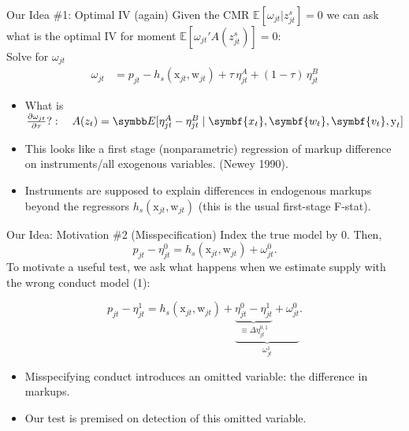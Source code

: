 \documentclass[aspectratio=169,10pt]{beamer}
\begin{document}
\begin{frame}{Our Idea \#1: Optimal IV (again)}
Given the CMR $\mathbb{E}[\omega_{jt}  | z_{jt}^s]=0$ we can ask what is the optimal IV for moment $\mathbb{E}[\omega_{jt}' A(z_{jt}^s)]=0$:\\
\vspace{0.25cm}
Solve for $\omega_{jt}$
\begin{align*}
\omega_{jt} &= p_{jt} - h_s(\textrm{x}_{jt},\textrm{w}_{jt}) + \tau\, \eta_{jt}^A + (1-\tau)\,\eta_{jt}^B
\end{align*}
\begin{itemize}
  \item What is $\frac{\partial \omega_{jt}}{\partial \tau}?: \quad A(z_t) = \E[\eta_{jt}^A - \eta_{jt}^B \mid \symbf{x_t}, \symbf{w_t}, \symbf{v_t}, \textrm{y}_t]$
  \item This looks like a \alert{first stage} (nonparametric) regression of markup difference on instruments/all exogenous variables. (Newey 1990).
  \item Instruments are supposed to explain \alert{differences in endogenous markups} beyond the regressors $h_s(\textrm{x}_{jt},\textrm{w}_{jt})$ (this is the usual first-stage F-stat).
\end{itemize}
\end{frame}


\begin{frame}[plain,label=misspecification]{Our Idea: Motivation \#2 (Misspecification)}
Index the \alert{true} model by $0$. Then,
$$ p_{jt} -\eta^0_{jt}= h_s(\textrm{x}_{jt},\textrm{w}_{jt}) + \omega^0_{jt}.$$
To motivate a useful test, we ask what happens when we estimate supply with the \alert{wrong} conduct model (1):

$$p_{jt} -\eta_{jt}^1 = h_s(\textrm{x}_{jt},\textrm{w}_{jt}) + \underbrace{\underbrace{\eta^0_{jt} - \eta^1_{jt}}_{\equiv \Delta \eta_{jt}^{0,1}} +  \omega_{jt}^{0}}_{\omega_{jt}^{1}}.$$
\begin{itemize}
\item Misspecifying conduct introduces an omitted variable: the difference in markups.
\item Our test is premised on detection of this omitted variable.
\end{itemize}
\end{frame}
\end{document}
